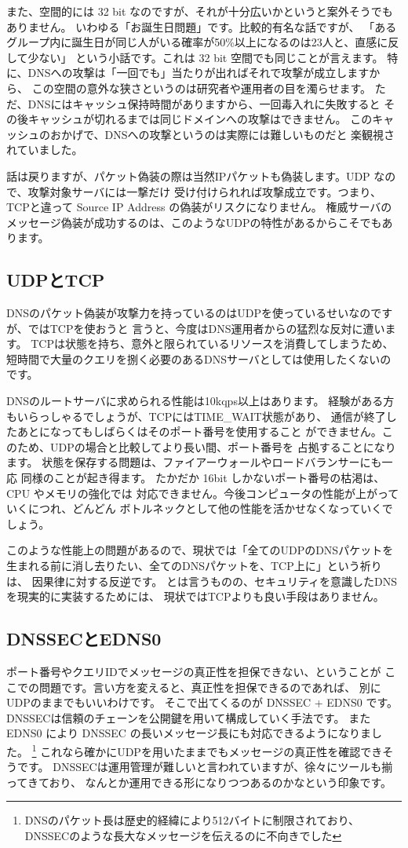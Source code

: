 また、空間的には 32 bit なのですが、それが十分広いかというと案外そうでもありません。
いわゆる「お誕生日問題」です。比較的有名な話ですが、
「あるグループ内に誕生日が同じ人がいる確率が50\%以上になるのは23人と、直感に反して少ない」
という小話です。これは 32 bit 空間でも同じことが言えます。
特に、DNSへの攻撃は「一回でも」当たりが出ればそれで攻撃が成立しますから、
この空間の意外な狭さというのは研究者や運用者の目を濁らせます。
ただ、DNSにはキャッシュ保持時間がありますから、一回毒入れに失敗すると
その後キャッシュが切れるまでは同じドメインへの攻撃はできません。
このキャッシュのおかげで、DNSへの攻撃というのは実際には難しいものだと
楽観視されていました。

話は戻りますが、パケット偽装の際は当然IPパケットも偽装します。UDP なので、攻撃対象サーバには一撃だけ
受け付けられれば攻撃成立です。つまり、TCPと違って Source IP Address の偽装がリスクになりません。
権威サーバのメッセージ偽装が成功するのは、このようなUDPの特性があるからこそでもあります。

\subsection{UDPとTCP}
DNSのパケット偽装が攻撃力を持っているのはUDPを使っているせいなのですが、ではTCPを使おうと
言うと、今度はDNS運用者からの猛烈な反対に遭います。
TCPは状態を持ち、意外と限られているリソースを消費してしまうため、
短時間で大量のクエリを捌く必要のあるDNSサーバとしては使用したくないのです。

DNSのルートサーバに求められる性能は10kqps以上はあります。
経験がある方もいらっしゃるでしょうが、TCPにはTIME\_WAIT状態があり、
通信が終了したあとになってもしばらくはそのポート番号を使用すること
ができません。このため、UDPの場合と比較してより長い間、ポート番号を
占拠することになります。
状態を保存する問題は、ファイアーウォールやロードバランサーにも一応
同様のことが起き得ます。
たかだか 16bit しかないポート番号の枯渇は、CPU やメモリの強化では
対応できません。今後コンピュータの性能が上がっていくにつれ、どんどん
ボトルネックとして他の性能を活かせなくなっていくでしょう。

このような性能上の問題があるので、現状では「全てのUDPのDNSパケットを
生まれる前に消し去りたい、全てのDNSパケットを、TCP上に」という祈りは、
因果律に対する反逆です。
とは言うものの、セキュリティを意識したDNSを現実的に実装するためには、
現状ではTCPよりも良い手段はありません。

\subsection{DNSSECとEDNS0}
ポート番号やクエリIDでメッセージの真正性を担保できない、ということが
ここでの問題です。言い方を変えると、真正性を担保できるのであれば、
別にUDPのままでもいいわけです。
そこで出てくるのが DNSSEC + EDNS0 です。
DNSSECは信頼のチェーンを公開鍵を用いて構成していく手法です。
また EDNS0 により DNSSEC の長いメッセージ長にも対応できるようになりました。
\footnote{DNSのパケット長は歴史的経緯により512バイトに制限されており、
DNSSECのような長大なメッセージを伝えるのに不向きでした}
これなら確かにUDPを用いたままでもメッセージの真正性を確認できそうです。
DNSSECは運用管理が難しいと言われていますが、徐々にツールも揃ってきており、
なんとか運用できる形になりつつあるのかなという印象です。

